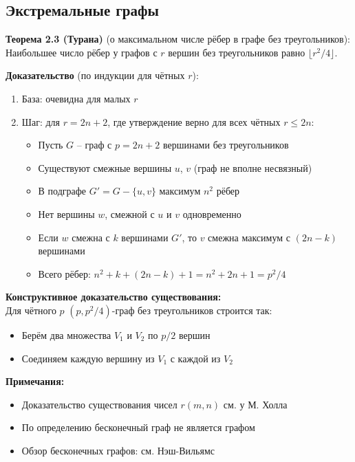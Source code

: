 \subsection{Экстремальные графы}

\noindent\textbf{Теорема 2.3 (Турана)} (о максимальном числе рёбер в графе без треугольников):\\
Наибольшее число рёбер у графов с $r$ вершин без треугольников равно $\lfloor r^2/4 \rfloor$.

\noindent\textbf{Доказательство} (по индукции для чётных $r$):
\begin{enumerate}[noitemsep,topsep=0pt]
\item База: очевидна для малых $r$
\item Шаг: для $r = 2n + 2$, где утверждение верно для всех чётных $r \leq 2n$:
   \begin{itemize}[noitemsep]
   \item Пусть $G$ -- граф с $p = 2n + 2$ вершинами без треугольников
   \item Существуют смежные вершины $u$, $v$ (граф не вполне несвязный)
   \item В подграфе $G' = G - \{u, v\}$ максимум $n^2$ рёбер
   \item Нет вершины $w$, смежной с $u$ и $v$ одновременно
   \item Если $w$ смежна с $k$ вершинами $G'$, то $v$ смежна максимум с $(2n - k)$ вершинами
   \item Всего рёбер: $n^2 + k + (2n - k) + 1 = n^2 + 2n + 1 = p^2/4$
   \end{itemize}
\end{enumerate}

\noindent\textbf{Конструктивное доказательство существования:}\\
Для чётного $p$ $(p, p^2/4)$-граф без треугольников строится так:
\begin{itemize}[noitemsep]
\item Берём два множества $V_1$ и $V_2$ по $p/2$ вершин
\item Соединяем каждую вершину из $V_1$ с каждой из $V_2$
\end{itemize}

\noindent\textbf{Примечания:}
\begin{itemize}[noitemsep]
\item Доказательство существования чисел $r(m, n)$ см. у М. Холла
\item По определению бесконечный граф не является графом
\item Обзор бесконечных графов: см. Нэш-Вильямс
\end{itemize}
